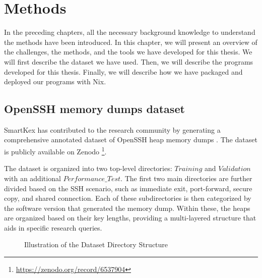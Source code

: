 \chapter{Methods}\label{chap:methods}


In the preceding chapters, all the necessary background knowledge to understand the methods have been introduced. In this chapter, we will present an overview of the challenges, the methods, and the tools we have developed for this thesis. We will first describe the dataset we have used. Then, we will describe the programs developed for this thesis. Finally, we will describe how we have packaged and deployed our programs with Nix.



\section{OpenSSH memory dumps dataset}\label{sec:background:kex:dataset}

    SmartKex has contributed to the research community by generating a comprehensive annotated dataset of OpenSSH heap memory dumps \cite{SmartKex22}. The dataset is publicly available on Zenodo \footnote{\url{https://zenodo.org/record/6537904}}. 

    \begin{minipage}{\dimexpr\linewidth-20pt}
        The dataset is organized into two top-level directories: $Training$ and $Validation$ with an additional $Performance\_Test$. The first two main directories are further divided based on the SSH scenario, such as immediate exit, port-forward, secure copy, and shared connection. Each of these subdirectories is then categorized by the software version that generated the memory dump. Within these, the heaps are organized based on their key lengths, providing a multi-layered structure that aids in specific research queries.

        \begin{figure}[H]
            \centering
            \caption{Illustration of the Dataset Directory Structure}
            \label{fig:dataset_structure}
            \begin{minipage}{0.6\textwidth}
        \end{minipage}
        \end{figure}
    \end{minipage}

